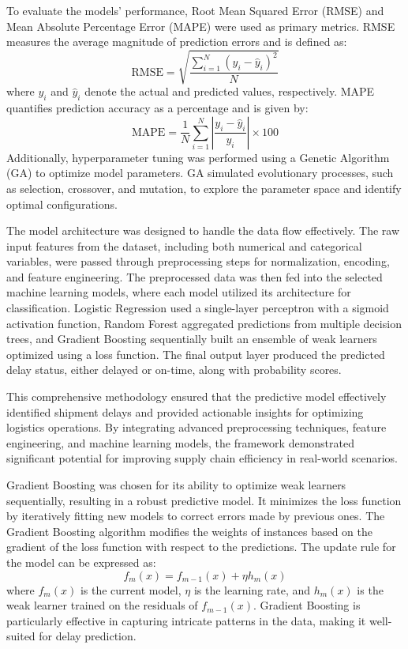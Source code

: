 \documentclass[conference]{IEEEtran}
\begin{document}
To evaluate the models' performance, Root Mean Squared Error (RMSE) and Mean Absolute Percentage Error (MAPE) were used as primary metrics. RMSE measures the average magnitude of prediction errors and is defined as:
\[
\text{RMSE} = \sqrt{\frac{\sum_{i=1}^N (y_i - \hat{y}_i)^2}{N}}
\]
where $y_i$ and $\hat{y}_i$ denote the actual and predicted values, respectively. MAPE quantifies prediction accuracy as a percentage and is given by:
\[
\text{MAPE} = \frac{1}{N} \sum_{i=1}^N \left| \frac{y_i - \hat{y}_i}{y_i} \right| \times 100
\]
Additionally, hyperparameter tuning was performed using a Genetic Algorithm (GA) to optimize model parameters. GA simulated evolutionary processes, such as selection, crossover, and mutation, to explore the parameter space and identify optimal configurations.

The model architecture was designed to handle the data flow effectively. The raw input features from the dataset, including both numerical and categorical variables, were passed through preprocessing steps for normalization, encoding, and feature engineering. The preprocessed data was then fed into the selected machine learning models, where each model utilized its architecture for classification. Logistic Regression used a single-layer perceptron with a sigmoid activation function, Random Forest aggregated predictions from multiple decision trees, and Gradient Boosting sequentially built an ensemble of weak learners optimized using a loss function. The final output layer produced the predicted delay status, either delayed or on-time, along with probability scores.

This comprehensive methodology ensured that the predictive model effectively identified shipment delays and provided actionable insights for optimizing logistics operations. By integrating advanced preprocessing techniques, feature engineering, and machine learning models, the framework demonstrated significant potential for improving supply chain efficiency in real-world scenarios.

Gradient Boosting was chosen for its ability to optimize weak learners sequentially, resulting in a robust predictive model. It minimizes the loss function by iteratively fitting new models to correct errors made by previous ones. The Gradient Boosting algorithm modifies the weights of instances based on the gradient of the loss function with respect to the predictions. The update rule for the model can be expressed as:
\begin{equation}
f_{m}(x) = f_{m-1}(x) + \eta h_{m}(x)
\end{equation}
where $f_{m}(x)$ is the current model, $\eta$ is the learning rate, and $h_{m}(x)$ is the weak learner trained on the residuals of $f_{m-1}(x)$. Gradient Boosting is particularly effective in capturing intricate patterns in the data, making it well-suited for delay prediction.
\end{document}
